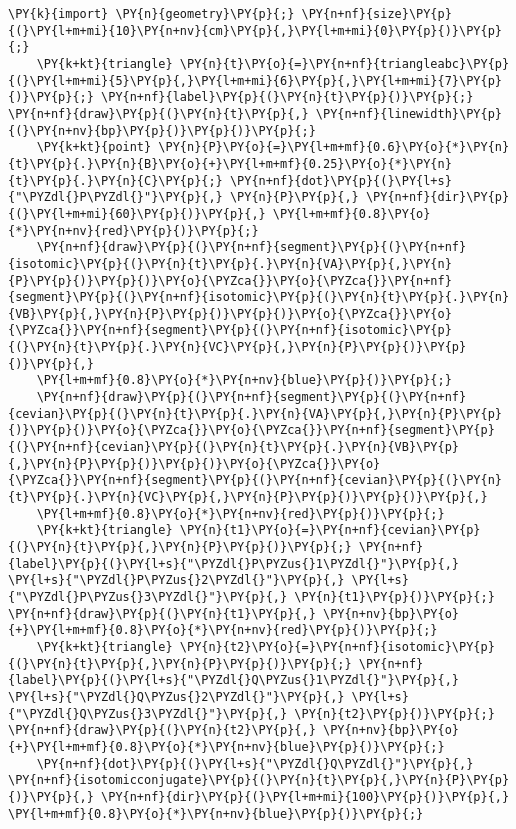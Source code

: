 \begin{Verbatim}[commandchars=\\\{\}]
    \PY{k}{import} \PY{n}{geometry}\PY{p}{;} \PY{n+nf}{size}\PY{p}{(}\PY{l+m+mi}{10}\PY{n+nv}{cm}\PY{p}{,}\PY{l+m+mi}{0}\PY{p}{)}\PY{p}{;}
    \PY{k+kt}{triangle} \PY{n}{t}\PY{o}{=}\PY{n+nf}{triangleabc}\PY{p}{(}\PY{l+m+mi}{5}\PY{p}{,}\PY{l+m+mi}{6}\PY{p}{,}\PY{l+m+mi}{7}\PY{p}{)}\PY{p}{;} \PY{n+nf}{label}\PY{p}{(}\PY{n}{t}\PY{p}{)}\PY{p}{;} \PY{n+nf}{draw}\PY{p}{(}\PY{n}{t}\PY{p}{,} \PY{n+nf}{linewidth}\PY{p}{(}\PY{n+nv}{bp}\PY{p}{)}\PY{p}{)}\PY{p}{;}
    \PY{k+kt}{point} \PY{n}{P}\PY{o}{=}\PY{l+m+mf}{0.6}\PY{o}{*}\PY{n}{t}\PY{p}{.}\PY{n}{B}\PY{o}{+}\PY{l+m+mf}{0.25}\PY{o}{*}\PY{n}{t}\PY{p}{.}\PY{n}{C}\PY{p}{;} \PY{n+nf}{dot}\PY{p}{(}\PY{l+s}{"\PYZdl{}P\PYZdl{}"}\PY{p}{,} \PY{n}{P}\PY{p}{,} \PY{n+nf}{dir}\PY{p}{(}\PY{l+m+mi}{60}\PY{p}{)}\PY{p}{,} \PY{l+m+mf}{0.8}\PY{o}{*}\PY{n+nv}{red}\PY{p}{)}\PY{p}{;}
    \PY{n+nf}{draw}\PY{p}{(}\PY{n+nf}{segment}\PY{p}{(}\PY{n+nf}{isotomic}\PY{p}{(}\PY{n}{t}\PY{p}{.}\PY{n}{VA}\PY{p}{,}\PY{n}{P}\PY{p}{)}\PY{p}{)}\PY{o}{\PYZca{}}\PY{o}{\PYZca{}}\PY{n+nf}{segment}\PY{p}{(}\PY{n+nf}{isotomic}\PY{p}{(}\PY{n}{t}\PY{p}{.}\PY{n}{VB}\PY{p}{,}\PY{n}{P}\PY{p}{)}\PY{p}{)}\PY{o}{\PYZca{}}\PY{o}{\PYZca{}}\PY{n+nf}{segment}\PY{p}{(}\PY{n+nf}{isotomic}\PY{p}{(}\PY{n}{t}\PY{p}{.}\PY{n}{VC}\PY{p}{,}\PY{n}{P}\PY{p}{)}\PY{p}{)}\PY{p}{,}
    \PY{l+m+mf}{0.8}\PY{o}{*}\PY{n+nv}{blue}\PY{p}{)}\PY{p}{;}
    \PY{n+nf}{draw}\PY{p}{(}\PY{n+nf}{segment}\PY{p}{(}\PY{n+nf}{cevian}\PY{p}{(}\PY{n}{t}\PY{p}{.}\PY{n}{VA}\PY{p}{,}\PY{n}{P}\PY{p}{)}\PY{p}{)}\PY{o}{\PYZca{}}\PY{o}{\PYZca{}}\PY{n+nf}{segment}\PY{p}{(}\PY{n+nf}{cevian}\PY{p}{(}\PY{n}{t}\PY{p}{.}\PY{n}{VB}\PY{p}{,}\PY{n}{P}\PY{p}{)}\PY{p}{)}\PY{o}{\PYZca{}}\PY{o}{\PYZca{}}\PY{n+nf}{segment}\PY{p}{(}\PY{n+nf}{cevian}\PY{p}{(}\PY{n}{t}\PY{p}{.}\PY{n}{VC}\PY{p}{,}\PY{n}{P}\PY{p}{)}\PY{p}{)}\PY{p}{,}
    \PY{l+m+mf}{0.8}\PY{o}{*}\PY{n+nv}{red}\PY{p}{)}\PY{p}{;}
    \PY{k+kt}{triangle} \PY{n}{t1}\PY{o}{=}\PY{n+nf}{cevian}\PY{p}{(}\PY{n}{t}\PY{p}{,}\PY{n}{P}\PY{p}{)}\PY{p}{;} \PY{n+nf}{label}\PY{p}{(}\PY{l+s}{"\PYZdl{}P\PYZus{}1\PYZdl{}"}\PY{p}{,} \PY{l+s}{"\PYZdl{}P\PYZus{}2\PYZdl{}"}\PY{p}{,} \PY{l+s}{"\PYZdl{}P\PYZus{}3\PYZdl{}"}\PY{p}{,} \PY{n}{t1}\PY{p}{)}\PY{p}{;} \PY{n+nf}{draw}\PY{p}{(}\PY{n}{t1}\PY{p}{,} \PY{n+nv}{bp}\PY{o}{+}\PY{l+m+mf}{0.8}\PY{o}{*}\PY{n+nv}{red}\PY{p}{)}\PY{p}{;}
    \PY{k+kt}{triangle} \PY{n}{t2}\PY{o}{=}\PY{n+nf}{isotomic}\PY{p}{(}\PY{n}{t}\PY{p}{,}\PY{n}{P}\PY{p}{)}\PY{p}{;} \PY{n+nf}{label}\PY{p}{(}\PY{l+s}{"\PYZdl{}Q\PYZus{}1\PYZdl{}"}\PY{p}{,} \PY{l+s}{"\PYZdl{}Q\PYZus{}2\PYZdl{}"}\PY{p}{,} \PY{l+s}{"\PYZdl{}Q\PYZus{}3\PYZdl{}"}\PY{p}{,} \PY{n}{t2}\PY{p}{)}\PY{p}{;} \PY{n+nf}{draw}\PY{p}{(}\PY{n}{t2}\PY{p}{,} \PY{n+nv}{bp}\PY{o}{+}\PY{l+m+mf}{0.8}\PY{o}{*}\PY{n+nv}{blue}\PY{p}{)}\PY{p}{;}
    \PY{n+nf}{dot}\PY{p}{(}\PY{l+s}{"\PYZdl{}Q\PYZdl{}"}\PY{p}{,} \PY{n+nf}{isotomicconjugate}\PY{p}{(}\PY{n}{t}\PY{p}{,}\PY{n}{P}\PY{p}{)}\PY{p}{,} \PY{n+nf}{dir}\PY{p}{(}\PY{l+m+mi}{100}\PY{p}{)}\PY{p}{,} \PY{l+m+mf}{0.8}\PY{o}{*}\PY{n+nv}{blue}\PY{p}{)}\PY{p}{;}


\end{Verbatim}
